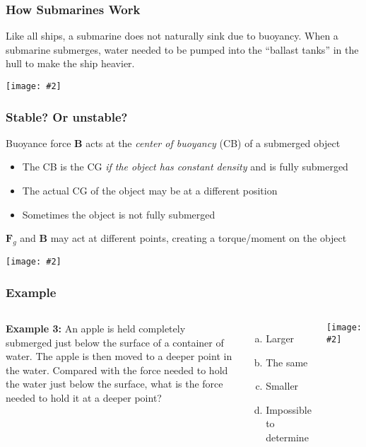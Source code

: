\documentclass[12pt,aspectratio=169]{beamer}
\newcommand{\pic}[2]{\texttt{[image: \#2]}}
\newcommand{\mb}[1]{\mathbf{#1}}
\begin{document}
\begin{frame}
  \frametitle{How Submarines Work}
  Like all ships, a submarine does not naturally sink due to buoyancy. When a
  submarine submerges, water needed to be pumped into the  ``ballast tanks'' in
  the hull to make the ship heavier.
  \begin{center}
    \pic{1}{risinglemur.jpg}
  \end{center}
\end{frame}



\begin{frame}
  \frametitle{Stable? Or unstable?}
  Buoyance force $\mb{B}$ acts at the \emph{center of buoyancy} (CB) of a
  submerged object
  \begin{itemize}
  \item The CB is the CG \emph{if the object has constant density} and is
    fully submerged
  \item The actual CG of the object may be at a different position
  \item Sometimes the object is not fully submerged
  \end{itemize}
  
  $\mb{F}_g$ and $\mb{B}$ may act at different points, creating a torque/moment
  on the object
  \begin{center}
    \pic{.5}{stable-unstable.jpg}
  \end{center}
\end{frame}



\begin{frame}
  \frametitle{Example}
  \begin{columns}

    \textbf{Example 3:} An apple is held completely submerged just below the
    surface of a container of water. The apple is then moved to a deeper point
    in the water. Compared with the force needed to hold the water just below
    the surface, what is the force needed to hold it at a deeper point?
    \begin{enumerate}[(a)]
    \item Larger
    \item The same
    \item Smaller
    \item Impossible to determine
    \end{enumerate}

    \pic{1}{apple.jpg}
  \end{columns}
\end{frame}
\end{document}
